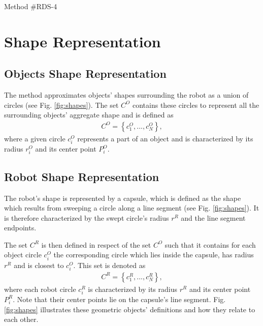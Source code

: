 \documentclass{article}
\begin{document}
{\centering \LARGE Method \#RDS-4\\}
\section{Shape Representation}

\subsection{Objects Shape Representation}

The method approximates objects' shapes surrounding the robot as a union of circles (see Fig. \ref{fig:shapes}). The set $ C^O $ contains these circles to represent all the surrounding objects' aggregate shape and is defined as
\begin{align*}
C^O = \left\{ c_1^O, ... , c_N^O \right\} ,
\end{align*}
where a given circle $ c_i^O $ represents a part of an object and is characterized by its radius $ r_i^O $ and its center point $ P_i^O $.


\subsection{Robot Shape Representation}

The robot's shape is represented by a capsule, which is defined as the shape which results from sweeping a circle along a line segment (see Fig. \ref{fig:shapes}). It is therefore characterized by the swept circle's radius $ r^R $ and the line segment endpoints.

The set $ C^R $ is then defined in respect of the set $ C^O $ such that it contains for each object circle $ c_i^O $ the corresponding circle which lies inside the capsule, has radius $ r^R $ and is closest to $ c_i^O  $. This set is denoted as
\begin{align*}
C^R = \left\{ c_1^R, ... , c_N^R \right\} ,
\end{align*}
where each robot circle $ c_i^R $ is characterized by its radius $ r^R $ and its center point $ P_i^R $.
Note that their center points lie on the capsule's line segment. Fig. \ref{fig:shapes} illustrates these geometric objects' definitions and how they relate to each other.
\end{document}
